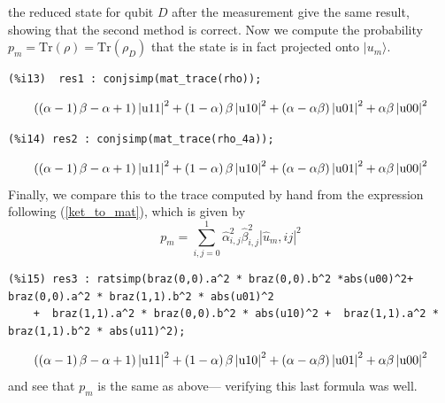 \documentclass[leqno,10pt]{article}
\newcommand{\ket}[1]{{\lvert#1 \rangle}}
\begin{document}
the reduced state for qubit $D$ after the measurement give the same result, showing that the second
method is correct. Now we compute the probability 
$p_m=\mbox{Tr}(\rho)=\mbox{Tr}(\rho_D)$
that the state is in fact projected onto $\ket{u_m}$.
\begin{verbatim}
(%i13)  res1 : conjsimp(mat_trace(rho));
\end{verbatim}
\begin{dmath}[number={\%o13}]
 \left(\left(\alpha-1\right)\*\beta-\alpha+1\right)\*\left| \mathrm{u11}\right| ^{2}+\left(1-\alpha\right)\*\beta\*\left| \mathrm{u10}\right| ^{2}+\left(\alpha-\alpha\*\beta\right)\*\left| \mathrm{u01}\right| ^{2}+\alpha\*\beta\*\left| \mathrm{u00}\right| ^{2}\end{dmath}
\begin{verbatim}
(%i14) res2 : conjsimp(mat_trace(rho_4a));
\end{verbatim}
\begin{dmath}[number={\%o14}]
 \left(\left(\alpha-1\right)\*\beta-\alpha+1\right)\*\left| \mathrm{u11}\right| ^{2}+\left(1-\alpha\right)\*\beta\*\left| \mathrm{u10}\right| ^{2}+\left(\alpha-\alpha\*\beta\right)\*\left| \mathrm{u01}\right| ^{2}+\alpha\*\beta\*\left| \mathrm{u00}\right| ^{2}\end{dmath}
Finally, we compare this to the trace computed by hand from the expression following (\ref{ket_to_mat}),
which is given by
\begin{equation}
 p_m=\sum^1_{i,j=0} \widehat{\alpha}_{i,j}^2 \widehat{\beta}_{i,j}^2 |\widehat{u}_m,ij|^2
\end{equation}
\begin{verbatim}
(%i15) res3 : ratsimp(braz(0,0).a^2 * braz(0,0).b^2 *abs(u00)^2+ braz(0,0).a^2 * braz(1,1).b^2 * abs(u01)^2 
    +  braz(1,1).a^2 * braz(0,0).b^2 * abs(u10)^2 +  braz(1,1).a^2 * braz(1,1).b^2 * abs(u11)^2);
\end{verbatim}
\begin{dmath}[number={\%o15}]
 \left(\left(\alpha-1\right)\*\beta-\alpha+1\right)\*\left| \mathrm{u11}\right| ^{2}+\left(1-\alpha\right)\*\beta\*\left| \mathrm{u10}\right| ^{2}+\left(\alpha-\alpha\*\beta\right)\*\left| \mathrm{u01}\right| ^{2}+\alpha\*\beta\*\left| \mathrm{u00}\right| ^{2}\end{dmath}
and see that $p_m$ is the same as above--- verifying this last formula was well. 
\printindex
\end{document}
